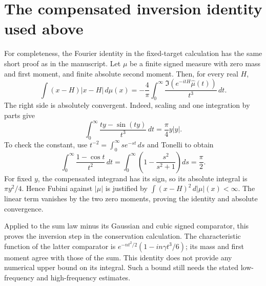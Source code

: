 \section{The compensated inversion identity used above}

For completeness, the Fourier identity in the fixed-target calculation
has the same short proof as in the manuscript. Let $\mu$ be a finite
signed measure with zero mass and first moment, and finite absolute
second moment. Then, for every real $H$,
\[
 \int(x-H)|x-H|\,d\mu(x)
 =-\frac4\pi\int_0^\infty
       \frac{\Im(e^{-itH}\widehat\mu(t))}{t^3}\,dt.
\]
The right side is absolutely convergent. Indeed, scaling and one
integration by parts give
\[
 \int_0^\infty\frac{ty-\sin(ty)}{t^3}\,dt
       =\frac\pi4y|y|.
\]
To check the constant, use $t^{-2}=\int_0^\infty s e^{-st}\,ds$ and
Tonelli to obtain
\[
 \int_0^\infty\frac{1-\cos t}{t^2}\,dt
 =\int_0^\infty\left(1-\frac{s^2}{s^2+1}\right)ds=\frac\pi2.
\]
For fixed $y$, the compensated integrand has its sign, so its absolute
integral is $\pi y^2/4$. Hence Fubini against $|\mu|$ is justified by
$\int(x-H)^2\,d|\mu|(x)<\infty$. The linear term vanishes by the
two zero moments, proving the identity and absolute convergence.

Applied to the sum law minus its Gaussian and cubic signed comparator,
this proves the inversion step in the conservation calculation. The
characteristic function of the latter comparator is
$e^{-nt^2/2}(1-in\gamma t^3/6)$; its mass and first moment agree
with those of the sum. This identity does not provide any numerical
upper bound on its integral. Such a bound still needs the stated
low-frequency and high-frequency estimates.
